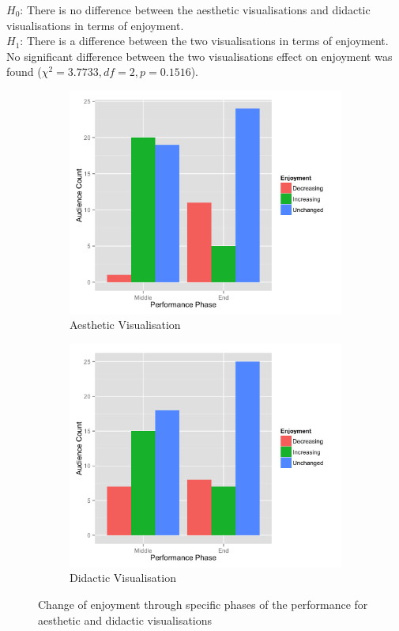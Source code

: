 \documentclass{article}
\begin{document}
$H_0$: There is no difference between the aesthetic visualisations and didactic visualisations in terms of enjoyment.\\
$H_1$: There is a difference between the two visualisations in terms of enjoyment.\\

No significant difference between the two visualisations effect on enjoyment was found ($\chi^2=3.7733,df=2,p=0.1516$).

\begin{figure}[t]
\centering
\begin{subfigure}{.5\textwidth}
    \centering
    \includegraphics[width=1.0\linewidth]{graphs/enjoyment-change-aesthetic.png}
    \caption{Aesthetic Visualisation}
    \label{aestheticenjoymentchange}
\end{subfigure}%
\begin{subfigure}{.5\textwidth}
    \centering
    \includegraphics[width=1.0\linewidth]{graphs/enjoyment-change-didactic.png}
    \caption{Didactic Visualisation}
    \label{didacticenjoymentchange}
\end{subfigure}
\caption{Change of enjoyment through specific phases of the performance for aesthetic and didactic visualisations}
\end{figure}
\end{document}
